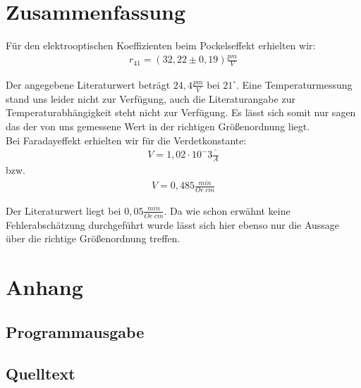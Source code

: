 \documentclass[12pt]{article}
\begin{document}
\section{Zusammenfassung}
Für den elektrooptischen Koeffizienten beim Pockelseffekt erhielten wir:
\begin{align*}
 r_{41} = (32,22 \pm 0,19) \frac{pm}{V}
\end{align*}

Der angegebene Literaturwert beträgt $24,4 \frac{pm}{V}$ bei $21^\circ$. Eine Temperaturmessung stand uns leider nicht zur Verfügung, auch die Literaturangabe zur Temperaturabhängigkeit steht nicht zur Verfügung. Es lässt sich somit nur sagen das der von uns gemessene Wert in der richtigen Größenordnung liegt.\\

Bei Faradayeffekt erhielten wir für die Verdetkonstante:
\begin{align}
 V =  1,02 \cdot 10^-3 \frac{^\circ}{A}
\end{align}
bzw.
\begin{align}
 V = 0,485 \frac{min}{Oe~cm}
\end{align}

Der Literaturwert liegt bei $0,05 \frac{min}{Oe~cm}$. Da wie schon erwähnt keine Fehlerabschätzung durchgeführt wurde lässt sich hier ebenso nur die Aussage über die richtige Größenordnung treffen.

\section{Anhang}
\subsection{Programmausgabe}

\subsection{Quelltext}


\end{document}

